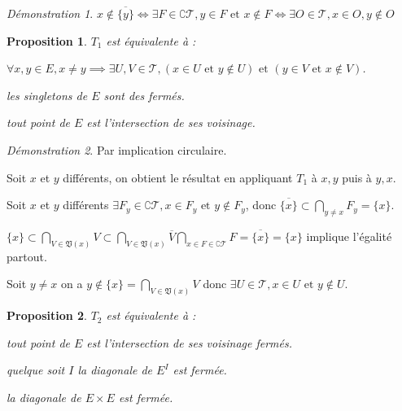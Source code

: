 \documentclass[a4paper, 11pt, french]{book}
\newenvironment{itemise}{\itemize}{\enditemize}
\theoremstyle{plain} %
\newtheorem{proposition}{Proposition}
\theoremstyle{definition} %
\theoremstyle{remark} %
\newtheorem*{demonstration}{Démonstration}
\newcommand{\1}{\mathds{1}}
\newcommand\et{\text{ et }}
\begin{document}
\begin{demonstration}
	$x\notin\overline{\{y\}}
		\iff\exists F\in\complement\mathscr{T}, y\in F\et x\notin F
		\iff\exists O\in\mathscr{T}, x\in O, y\notin O$
\end{demonstration}

\begin{proposition}
	$T_1$ est équivalente à :
	\begin{itemise}
		\item $\forall x, y\in E, x\neq y\implies\exists U, V\in\mathscr{T}, (x\in U\et y\notin U)\et(y\in V\et x\notin V)$.
		\item les singletons de $E$ sont des fermés.
		\item tout point de $E$ est l'intersection de ses voisinage.
	\end{itemise}
\end{proposition}

\begin{demonstration}
	Par implication circulaire.
	\begin{itemise}
		\item Soit $x$ et $y$ différents, on obtient le résultat en appliquant $T_1$ à $x, y$ puis à $y, x$.
		\item Soit $x$ et $y$ différents $\exists F_y\in\complement\mathscr{T}, x\in F_y\et y\notin F_y$, donc $\overline{\{x\}}\subset\bigcap_{y\neq x}F_y=\{x\}$.
		\item $\{x\}\subset\bigcap_{V\in\mathfrak{V}(x)}V\subset\bigcap_{V\in\mathfrak{V}(x)}\overline{V}\bigcap_{x\in F\in\complement\mathscr{T}}F=\overline{\{x\}}=\{x\}$ implique l'égalité partout.
		\item Soit $y\neq x$ on a $y\notin\{x\}=\bigcap_{V\in\mathfrak{V}(x)}V$ donc $\exists U\in\mathscr{T}, x\in U\et y\notin U$.
	\end{itemise}
\end{demonstration}

\begin{proposition}
	$T_2$ est équivalente à :
	\begin{itemise}
		\item tout point de $E$ est l'intersection de ses voisinage fermés.
		\item quelque soit $I$ la diagonale de $E^I$ est fermée.
		\item la diagonale de $E\times E$ est fermée.
	\end{itemise}
\end{proposition}
\end{document}
